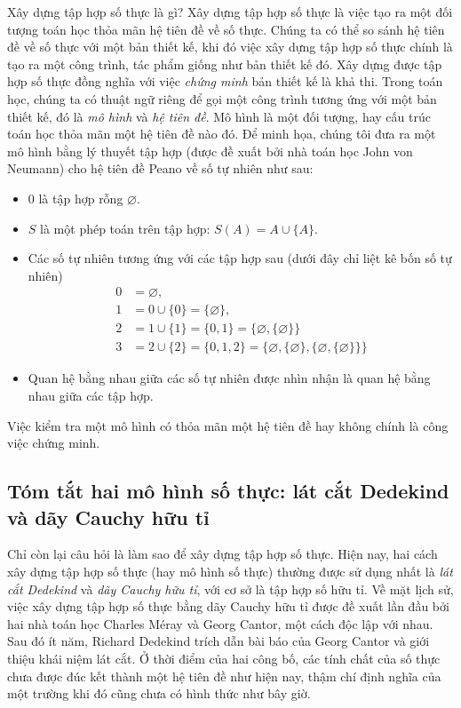 Xây dựng tập hợp số thực là gì? Xây dựng tập hợp số thực là việc tạo ra một đối tượng toán học thỏa mãn hệ tiên đề về số thực. Chúng ta có thể so sánh hệ tiên đề về số thực với một bản thiết kế, khi đó việc xây dựng tập hợp số thực chính là tạo ra một công trình, tác phẩm giống như bản thiết kế đó. Xây dựng được tập hợp số thực đồng nghĩa với việc \textit{chứng minh} bản thiết kế là khả thi. Trong toán học, chúng ta có thuật ngữ riêng để gọi một công trình tương ứng với một bản thiết kế, đó là \textit{mô hình} và \textit{hệ tiên đề}. Mô hình là một đối tượng, hay cấu trúc toán học thỏa mãn một hệ tiên đề nào đó. Để minh họa, chúng tôi đưa ra một mô hình bằng lý thuyết tập hợp (được đề xuất bởi nhà toán học John von Neumann) cho hệ tiên đề Peano về số tự nhiên như sau:
\begin{itemize}
    \item $0$ là tập hợp rỗng $\varnothing$.
    \item $S$ là một phép toán trên tập hợp: $S(A) = A \cup \{ A \}$.
    \item Các số tự nhiên tương ứng với các tập hợp sau (dưới đây chỉ liệt kê bốn số tự nhiên)
          \begin{align*}
              0 & = \varnothing,                                                                                                \\
              1 & = 0 \cup \{ 0 \} = \{ \varnothing \},                                                                         \\
              2 & = 1 \cup \{ 1 \} = \{ 0, 1 \}  = \{ \varnothing, \{ \varnothing \} \}                                         \\
              3 & = 2 \cup \{ 2 \} = \{ 0, 1, 2 \} = \{ \varnothing, \{ \varnothing \}, \{ \varnothing, \{ \varnothing \} \} \}
          \end{align*}
    \item Quan hệ bằng nhau giữa các số tự nhiên được nhìn nhận là quan hệ bằng nhau giữa các tập hợp.
\end{itemize}

Việc kiểm tra một mô hình có thỏa mãn một hệ tiên đề hay không chính là công việc chứng minh.

\subsection{Tóm tắt hai mô hình số thực: lát cắt Dedekind và dãy Cauchy hữu tỉ}

Chỉ còn lại câu hỏi là làm sao để xây dựng tập hợp số thực. Hiện nay, hai cách xây dựng tập hợp số thực (hay mô hình số thực) thường được sử dụng nhất là \textit{lát cắt Dedekind} và \textit{dãy Cauchy hữu tỉ}, với cơ sở là tập hợp số hữu tỉ. Về mặt lịch sử, việc xây dựng tập hợp số thực bằng dãy Cauchy hữu tỉ được đề xuất lần đầu bởi hai nhà toán học Charles M\'{e}ray và Georg Cantor, một cách độc lập với nhau. Sau đó ít năm, Richard Dedekind trích dẫn bài báo của Georg Cantor và giới thiệu khái niệm lát cắt. Ở thời điểm của hai công bố, các tính chất của số thực chưa được đúc kết thành một hệ tiên đề như hiện nay, thậm chí định nghĩa của một trường khi đó cũng chưa có hình thức như bây giờ.

